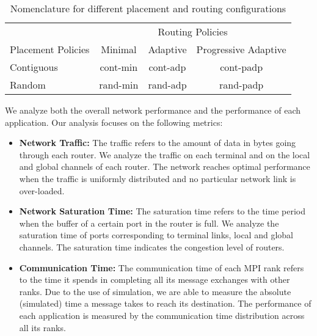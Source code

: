 
\begin{table}[ht]
\begin{center}
\caption{Nomenclature for different placement and routing configurations} 
\label{tab: placement routing configs}
\begin{tabular}{l c c c }
\toprule %
\toprule
&\multicolumn{3}{c}{Routing Policies} \\ 
\cmidrule(l){2-4}
Placement Policies & Minimal & Adaptive & Progressive Adaptive\\ %
\midrule %
Contiguous  &  cont-min   &  cont-adp    &  cont-padp   \\ %
\midrule
Random  &   rand-min  &   rand-adp   &  rand-padp   \\ 
\midrule %
\bottomrule %
\end{tabular}
\end{center}
\end{table}


We analyze both the overall network performance and the performance of each application.
Our analysis focuses on the following metrics:
\begin{itemize}

    \item \textbf{Network Traffic:} The traffic refers to the amount of data in bytes going through each router. We analyze the traffic on each terminal and on the local and global channels of each router. The network reaches optimal performance when the traffic is uniformly distributed and no particular network link is over-loaded. 
            
    \item \textbf{Network Saturation Time:} The saturation time refers to the time period when the buffer of a certain port in the router is full. We analyze the saturation time of ports corresponding to terminal links, local and global channels. The saturation time indicates the congestion level of routers. 
    
    \item \textbf{Communication Time:} The communication time of each MPI rank refers to the time it spends in completing all its message exchanges with other ranks. Due to the use of simulation, we are able to measure the absolute (simulated) time a message takes to reach its destination. The performance of each application is measured by the communication time distribution across all its ranks.    
    
    \end{itemize}


